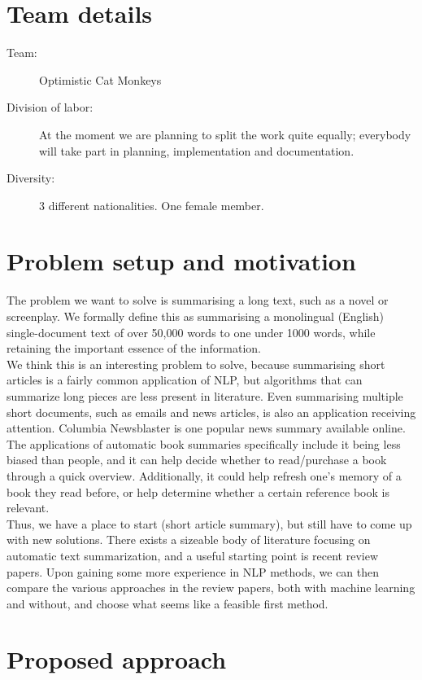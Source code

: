 \section{Team details}
\begin{description}
  \item[Team:] Optimistic Cat Monkeys
  \item[Division of labor:] At the moment we are planning to split the work
    quite equally; everybody will take part in planning, implementation and
    documentation.
  \item[Diversity:] 3 different nationalities. One female member.
\end{description}


\section{Problem setup and motivation}

The problem we want to solve is summarising a long text, such as a novel or screenplay. We formally define this as summarising a monolingual (English) single-document text of over 50,000 words to one under 1000 words, while retaining the important essence of the information.\\
We think this is an interesting problem to solve, because summarising short articles is a fairly common application of NLP, but algorithms that can summarize long pieces are less present in literature. Even summarising multiple short documents, such as emails and news articles, is also an application receiving attention. Columbia Newsblaster is one popular news summary available online. \\
The applications of automatic book summaries specifically include it being less biased than people, and it can help decide whether to read/purchase a book through a quick overview. Additionally, it could help refresh one's memory of a book they read before, or help determine whether a certain reference book is relevant.\\
Thus, we have a place to start (short article summary), but still have to come up with new solutions. There exists a sizeable body of literature focusing on automatic text summarization, and a useful starting point is recent review papers. Upon gaining some more experience in NLP methods, we can then compare the various approaches in the review papers, both with machine learning and without, and choose what seems like a feasible first method. \cite{Kumar2016}


\section{Proposed approach}

